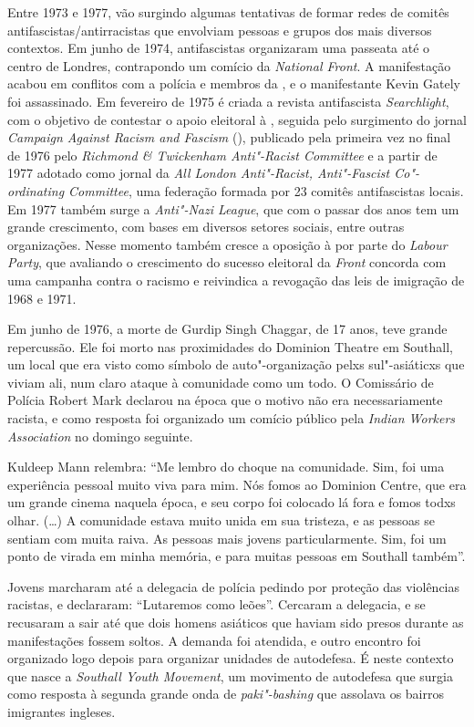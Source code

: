 Entre 1973 e 1977, vão surgindo algumas tentativas de formar redes de comitês antifascistas/antirracistas que envolviam pessoas e grupos dos mais diversos contextos. Em junho de 1974, antifascistas organizaram uma passeata até o centro de Londres, contrapondo um comício da \emph{National Front}. A manifestação acabou em conflitos com a polícia e membros da , e o manifestante Kevin Gately foi assassinado. Em fevereiro de 1975 é criada a revista antifascista \emph{Searchlight}, com o objetivo de contestar o apoio eleitoral à , seguida pelo surgimento do jornal \emph{Campaign Against Racism and Fascism} (), publicado pela primeira vez no final de 1976 pelo \emph{Richmond \& Twickenham Anti"-Racist Committee} e a partir de 1977 adotado como jornal da \emph{All London Anti"-Racist, Anti"-Fascist Co"-ordinating Committee}, uma federação formada por 23 comitês antifascistas locais. Em 1977 também surge a \emph{Anti"-Nazi League}, que com o passar dos anos tem um grande crescimento, com bases em diversos setores sociais, entre outras organizações. Nesse momento também cresce a oposição à  por parte do \emph{Labour Party}, que avaliando o crescimento do sucesso eleitoral da \emph{Front} concorda com uma campanha contra o racismo e reivindica a revogação das leis de imigração de 1968 e 1971.

Em junho de 1976, a morte de Gurdip Singh Chaggar, de 17 anos, teve grande repercussão. Ele foi morto nas proximidades do Dominion Theatre em Southall, um local que era visto como símbolo de auto"-organização pelxs sul"-asiáticxs que viviam ali, num claro ataque à comunidade como um todo. O Comissário de Polícia Robert Mark declarou na época que o motivo não era necessariamente racista, e como resposta foi organizado um comício público pela \emph{Indian Workers Association} no domingo seguinte.

Kuldeep Mann relembra: ``Me lembro do choque na comunidade. Sim, foi uma experiência pessoal muito viva para mim. Nós fomos ao Dominion Centre, que era um grande cinema naquela época, e seu corpo foi colocado lá fora e fomos todxs olhar. (\ldots{}) A comunidade estava muito unida em sua tristeza, e as pessoas se sentiam com muita raiva. As pessoas mais jovens particularmente. Sim, foi um ponto de virada em minha memória, e para muitas pessoas em Southall também''.

Jovens marcharam até a delegacia de polícia pedindo por proteção das violências racistas, e declararam: ``Lutaremos como leões''. Cercaram a delegacia, e se recusaram a sair até que dois homens asiáticos que haviam sido presos durante as manifestações fossem soltos. A demanda foi atendida, e outro encontro foi organizado logo depois para organizar unidades de autodefesa. É neste contexto que nasce a \emph{Southall Youth Movement}, um movimento de autodefesa que surgia como resposta à segunda grande onda de \emph{paki"-bashing} que assolava os bairros imigrantes ingleses.

